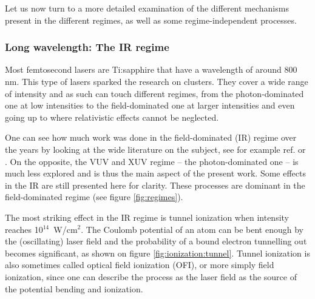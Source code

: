 Let us now turn to a more detailed examination of
the different mechanisms present in the different regimes, as well as
some regime-independent processes.



\subsubsection{Long wavelength: The IR regime}
\label{section:intro:mechanisms:ir}

Most femtosecond lasers are Ti:sapphire that have a wavelength of around 800 nm.
This type of lasers sparked the research on clusters. They cover a wide range of
intensity and as such can touch different regimes, from the photon-dominated
one at low intensities to the field-dominated one at larger intensities and
even going up to where relativistic effects cannot be neglected.

One can see how much work was done in the field-dominated (IR) regime over the
years by looking at the wide literature on the subject, see for example ref.
\cite{Fennel2010} or \cite{Ramunno2008}. On the opposite, the VUV and XUV regime
-- the photon-dominated one -- is much less explored and is thus the main
aspect of the present work. Some effects in the IR are still presented here
for clarity. These processes are dominant in the field-dominated regime (see
figure \ref{fig:regimes}).



The most striking effect in the IR regime is tunnel
ionization\cite[Chapter~3]{Brabec2009} when intensity reaches 10$^{14}$~W/cm$^2$.
The Coulomb potential of an atom can be bent enough by the (oscillating) laser
field and the probability of a bound electron tunnelling out becomes significant,
as shown on figure \ref{fig:ionization:tunnel}. Tunnel ionization is also
sometimes called optical field ionization (OFI), or more simply field
ionization, since one can describe the process as the laser field as the source of the potential bending and
ionization.



